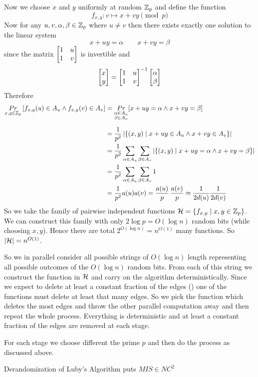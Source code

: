 Now we choose $x$ and $y$ uniformly at random $\mathbb{Z}_p$ and define the function $$f_{x,y}:v\mapsto x+vy\pmod{p}$$Now for any $u,v,\alpha,\beta\in \mathbb{Z}_p$ where $u\neq v$ then there exists exactly one solution to the linear system $$x+uy=\alpha \qquad x+vy=\beta$$ since the matrix $\left[\begin{matrix}1& u\\ 1& v\end{matrix}\right]$ is invertible and $$\left[\begin{matrix}x\\ y\end{matrix}\right] =\left[\begin{matrix}1&u\\ 1&v\end{matrix}\right]^{-1}\left[\begin{matrix}\alpha\\ \beta\end{matrix}\right]$$Therefore\begin{align*}
	\underset{x,y\in \mathbb{Z}_p}{Pr}\left[f_{x,y}(u)\in A_u\wedge f_{x,y}(v)\in A_v\right] & = \underset{\substack{\alpha\in A_u\\ \beta\in A_v}}{Pr}[x+uy=\alpha \wedge x+vy=\beta]\\[2mm]
	& = \frac1{p^2} \left| \{(x,y)\mid x+uy\in A_u\wedge x+vy\in A_v \} \right|\\
	& = \frac1{p^2} \sum_{\alpha\in A_u}\sum_{\beta\in A_v} |\{(x,y)\mid x+uy=\alpha \wedge x+vy=\beta\}|\\
	& = \frac1{p^2} \sum_{\alpha\in A_u}\sum_{\beta\in A_v}1\\
	& = \frac1{p^2}a(u)a(v)=\frac{a(u)}{p}\, \frac{a(v)}{p}\approx \frac1{2d(u)}\frac1{2d(v)}
\end{align*}
So we take the family of pairwise independent functions $\mathcal{H}=\{ f_{x,y}\mid x,y\in \mathbb{Z}_p\}$. We can construct this family with only $2\log p=O(\log n)$ random bits (while choosing $x,y$). Hence there are total $2^{O(\log n)}=n^{O(1)}$ many functions. So $|\mathcal{H}|=n^{O(1)}$. 

So we in parallel  consider all possible strings of $O(\log n)$ length representing all possible outcomes of the $O(\log n)$ random bits. From each of this string we construct the function in $\mathcal{H}$ and carry on the algorithm deterministically. Since we expect to delete at least a constant fraction of the edges () one of the functions must delete at least that many edges. So we pick the function which deletes the most edges and throw the other parallel computation away and then repeat the whole process. Everything is deterministic and at least a constant fraction of the edges are removed at each stage. 

For each stage we choose different the prime $p$ and then do the process as discussed above.
\begin{theorem}
	Derandomization of Luby's Algorithm puts $MIS\in NC^2$
\end{theorem}